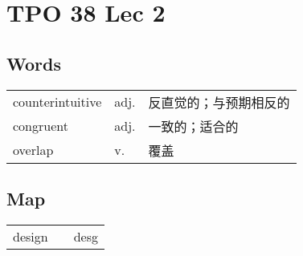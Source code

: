 \section{TPO 38 Lec 2}

\subsection{Words}

\begin{tabular}{lll}
    counterintuitive & adj. & 反直觉的；与预期相反的 \\
    congruent        & adj. & 一致的；适合的     \\
    overlap          & v.   & 覆盖          \\
\end{tabular}

\subsection{Map}

\begin{tabular}{rc@{\quad$\to$\quad}l}
    design &  & desg \\
\end{tabular}
